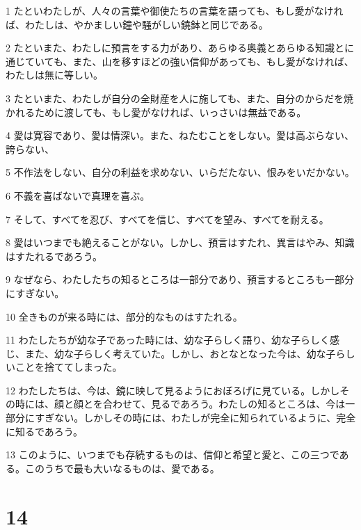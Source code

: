 \par 1 たといわたしが、人々の言葉や御使たちの言葉を語っても、もし愛がなければ、わたしは、やかましい鐘や騒がしい鐃鉢と同じである。
\par 2 たといまた、わたしに預言をする力があり、あらゆる奥義とあらゆる知識とに通じていても、また、山を移すほどの強い信仰があっても、もし愛がなければ、わたしは無に等しい。
\par 3 たといまた、わたしが自分の全財産を人に施しても、また、自分のからだを焼かれるために渡しても、もし愛がなければ、いっさいは無益である。
\par 4 愛は寛容であり、愛は情深い。また、ねたむことをしない。愛は高ぶらない、誇らない、
\par 5 不作法をしない、自分の利益を求めない、いらだたない、恨みをいだかない。
\par 6 不義を喜ばないで真理を喜ぶ。
\par 7 そして、すべてを忍び、すべてを信じ、すべてを望み、すべてを耐える。
\par 8 愛はいつまでも絶えることがない。しかし、預言はすたれ、異言はやみ、知識はすたれるであろう。
\par 9 なぜなら、わたしたちの知るところは一部分であり、預言するところも一部分にすぎない。
\par 10 全きものが来る時には、部分的なものはすたれる。
\par 11 わたしたちが幼な子であった時には、幼な子らしく語り、幼な子らしく感じ、また、幼な子らしく考えていた。しかし、おとなとなった今は、幼な子らしいことを捨ててしまった。
\par 12 わたしたちは、今は、鏡に映して見るようにおぼろげに見ている。しかしその時には、顔と顔とを合わせて、見るであろう。わたしの知るところは、今は一部分にすぎない。しかしその時には、わたしが完全に知られているように、完全に知るであろう。
\par 13 このように、いつまでも存続するものは、信仰と希望と愛と、この三つである。このうちで最も大いなるものは、愛である。

\chapter{14}

